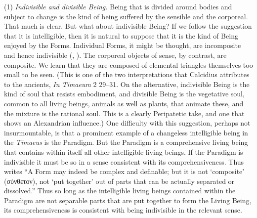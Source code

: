 (1) \emph{Indivisible and divisible Being.} Being that is divided around bodies and subject to change is the kind of being suffered by the sensible and the corporeal. That much is clear. But what about indivisible Being? If we follow the suggestion that it is intelligible, then it is natural to suppose that it is the kind of Being enjoyed by the Forms. Individual Forms, it might be thought, are incomposite and hence indivisible (\citealt[64]{Cornford:1935fk}, \citealt[71]{Robinson:1970lq}). The corporeal objects of sense, by contrast, are composite. We learn that they are composed of elemental triangles themselves too small to be seen. (This is one of the two interpretations that Calcidius attributes to the ancients, \emph{In Timaeum} 2 29--31. On the alternative, indivisible Being is the kind of soul that resists embodiment, and divisible Being is the vegetative soul, common to all living beings, animals as well as plants, that animate these, and the mixture is the rational soul. This is a clearly Peripatetic take, and one that shows an Alexandrian influence.) One difficulty with this suggestion, perhaps not insurmountable, is that a prominent example of a changeless intelligible being in the \emph{Timaeus} is the Paradigm. But the Paradigm is a comprehensive living being that contains within itself all other intelligible living beings. If the Paradigm is indivisible it must be so in a sense consistent with its comprehensiveness. Thus \citet[64]{Cornford:1935fk} writes ``A Form may indeed be complex and definable; but it is not `composite' ({\sbl σύνθετον}), not `put together' out of parts that can be actually separated or dissolved.'' Thus so long as the intelligible living beings contained within the Paradigm are not separable parts that are put together to form the Living Being, its comprehensiveness is consistent with being indivisible in the relevant sense.

